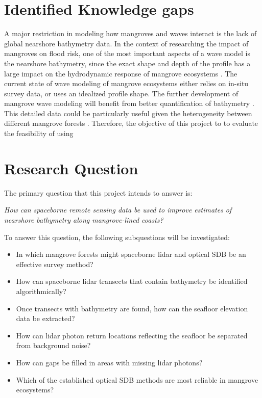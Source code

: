 \section{Identified Knowledge gaps}

A major restriction in modeling how mangroves and waves interact is the lack of global nearshore bathymetry data. In the context of researching the impact of mangroves on flood risk, one of the most important aspects of a wave model is the nearshore bathymetry, since the exact shape and depth of the profile has a large impact on the hydrodynamic response of mangrove ecosystems \parencite{Horstman2014,Maza2019}. The current state of wave modeling of mangrove ecosystems either relies on in-situ survey data, or uses an idealized profile shape. The further development of mangrove wave modeling will benefit from better quantification of bathymetry \parencite{Menendez2020,GijonMancheno2021}. This detailed data could be particularly useful given the heterogeneity between different mangrove forests \parencite{Mazda2013}. Therefore, the objective of this project to to evaluate the feasibility of using 

\section{Research Question}
The primary question that this project intends to answer is:

\emph{How can spaceborne remote sensing data be used to improve estimates of nearshore bathymetry along mangrove-lined coasts?}

To answer this question, the following subquestions will be investigated:

\begin{itemize}
      \item In which mangrove forests might spaceborne lidar and optical SDB be an effective survey method?
      \item How can spaceborne lidar transects that contain bathymetry be identified algorithmically?
      \item Once transects with bathymetry are found, how can the seafloor elevation data be extracted?
      \item How can lidar photon return locations reflecting the seafloor be separated from background noise?
      \item How can gaps be filled in areas with missing lidar photons?
      \item Which of the established optical SDB methods are most reliable in mangrove ecosystems?
\end{itemize}

